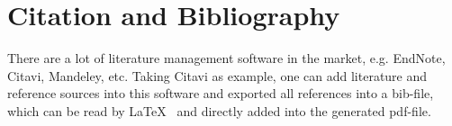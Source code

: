 \chapter{Citation and Bibliography}

There are a lot of literature management software in the market, e.g. EndNote, Citavi, Mandeley, etc. Taking Citavi as example, one can add literature and reference sources into this software and exported all references into a bib-file, which can be read by \LaTeX ~ and directly added into the generated pdf-file.


